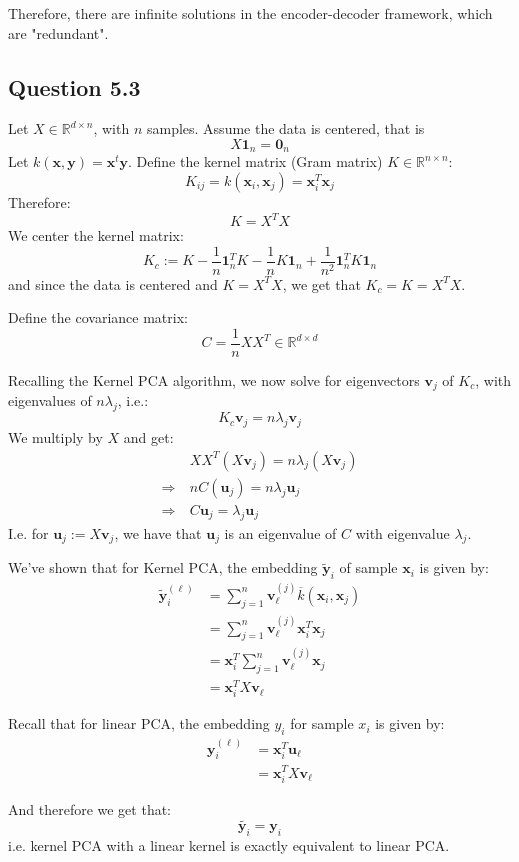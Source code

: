 \documentclass{article}
\begin{document}
Therefore, there are infinite solutions in the encoder-decoder framework, which are "redundant". 

\subsection*{Question 5.3}
Let $X \in \mathbb{R}^{d \times n}$, with $n$ samples. Assume the data is centered, that is
\[
  X \bm{1}_{n} = \bm{0}_{n}
\]
Let $k(\bm{x},\bm{y}) = \bm{x}^{t} \bm{y}$. Define the kernel matrix (Gram matrix) $K \in \mathbb{R}^{n \times n}$:
\[
  K_{ij} = k(\bm{x}_i, \bm{x}_j) = \bm{x}_i ^{T} \bm{x}_j
\]
Therefore:
\[
  K = X^{T} X
\]
We center the kernel matrix:
\[
  K_{c} := K - \frac{1}{n} \bm{1}_{n} ^{T} K - \frac{1}{n} K \bm{1}_{n} + \frac{1}{n ^2} \bm{1}_{n} ^{T} K \bm{1}_{n}
\]
and since the data is centered and $K = X^{T}X$, we get that $K_{c} =K = X^{T}X$. 

Define the covariance matrix:
\[
  C = \frac{1}{n} X X^{T} \in \mathbb{R}^{d \times d}
\]

Recalling the Kernel PCA algorithm, we now solve for eigenvectors $\bm{v}_{j}$ of $K_{c}$, with eigenvalues of $n \lambda_{j}$, i.e.:
\[
  K_{c} \bm{v}_j = n \lambda_j \bm{v}_j
\]
We multiply by $X$ and get:
\begin{align*}
  & X X ^{T} (X \bm{v}_j) = n \lambda_j (X \bm{v}_j) \\
  \Rightarrow \  & nC (\bm{u}_j)  = n \lambda_j \bm{u}_j \\
  \Rightarrow \ & C \bm{u}_j = \lambda_j \bm{u}_j
\end{align*}
I.e. for $\bm{u}_j := X \bm{v}_j$, we have that $\bm{u}_j$ is an eigenvalue of $C$ with eigenvalue $\lambda_j$. 

We've shown that for Kernel PCA, the embedding $\widetilde{\bm{y}}_i$ of sample $\bm{x}_i$ is given by:
\begin{align*}
  \widetilde{\bm{y}}_i^{(\ell)} &= \sum_{j=1}^{n} \bm{v}_\ell^{(j)} \overline{k} (\bm{x}_i, \bm{x}_j) \\
  &= \sum_{j=1}^{n} \bm{v}_\ell^{(j)} \bm{x}_i^{T} \bm{x}_j \\
  &= \bm{x}_i^{T} \sum_{j=1}^{n} \bm{v}_\ell^{(j)} \bm{x}_j \\
  &= \bm{x}_i ^{T} X \bm{v}_{\ell}
\end{align*}

Recall that for linear PCA, the embedding $y_i$ for sample $x_i$ is given by:
\begin{align*}
  \bm{y}_i^{(\ell)} &= \bm{x}_i ^{T} \bm{u}_{\ell}  \\
  &= \bm{x}_i ^{T} X \bm{v}_\ell
\end{align*}

And therefore we get that:
\[
  \widetilde{\bm{y}_i} = \bm{y}_i
\]
i.e. kernel PCA with a linear kernel is exactly equivalent to linear PCA. 
\end{document}
